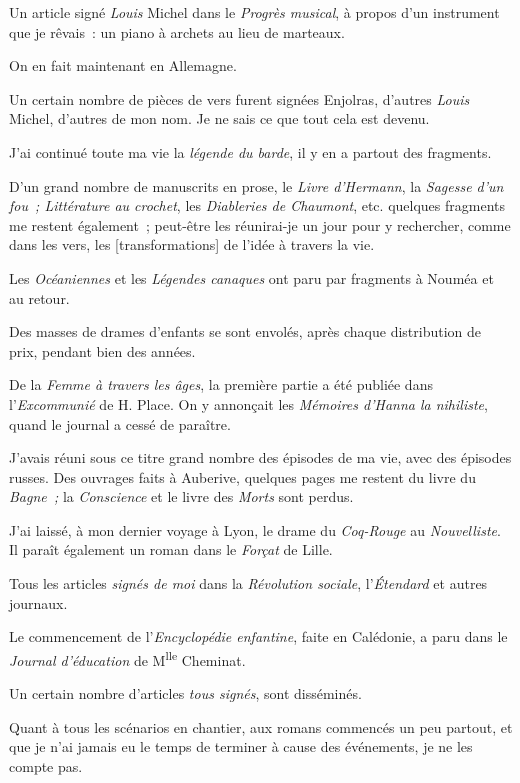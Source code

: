\documentclass[french,twoside]{book} %
\newcommand\corr[1]{#1}
\begin{document}
Un article signé \emph{Louis} Michel dans le \emph{Progrès musical}, à propos d’un instrument que je rêvais : un piano à archets au lieu de marteaux.\par
On en fait maintenant en Allemagne.\par
Un certain nombre de pièces de vers furent signées Enjolras, d’autres \emph{Louis} Michel, d’autres de mon nom. Je ne sais ce que tout cela est devenu.\par
J’ai continué toute ma vie la \emph{légende du barde}, il y en a partout des fragments.\par
D’un grand nombre de manuscrits en prose, le \emph{Livre d’Hermann}, la \emph{Sagesse d’un fou ; Littérature au crochet}, les \emph{Diableries de Chaumont}, etc. quelques fragments me restent également ; peut-être les réunirai-je un jour pour y rechercher,  comme dans les vers, les [{\corr transformations}] de l’idée à travers la vie.\par
Les \emph{Océaniennes} et les \emph{Légendes canaques} ont paru par fragments à Nouméa et au retour.\par
Des masses de drames d’enfants se sont envolés, après chaque distribution de prix, pendant bien des années.\par
De la \emph{Femme à travers les âges}, la première partie a été publiée dans l’\emph{Excommunié} de H. Place. On y annonçait les \emph{Mémoires d’Hanna la nihiliste}, quand le journal a cessé de paraître.\par
J’avais réuni sous ce titre grand nombre des épisodes de ma vie, avec des épisodes russes. Des ouvrages faits à Auberive, quelques pages me restent du livre du \emph{Bagne ;} la \emph{Conscience} et le livre des \emph{Morts} sont perdus.\par
J’ai laissé, à mon dernier voyage à Lyon, le drame du \emph{Coq-Rouge} au \emph{Nouvelliste}. Il paraît également un roman dans le \emph{Forçat} de Lille.\par
Tous les articles \emph{signés de moi} dans la \emph{Révolution sociale}, l’\emph{Étendard} et autres journaux.\par
Le commencement de l’\emph{Encyclopédie enfantine}, faite en Calédonie, a paru dans le \emph{Journal d’éducation} de M\textsuperscript{lle} Cheminat.\par
Un certain nombre d’articles \emph{tous signés}, sont disséminés.\par
Quant à tous les scénarios en chantier, aux  romans commencés un peu partout, et que je n’ai jamais eu le temps de terminer à cause des événements, je ne les compte pas.\par
\end{document}
